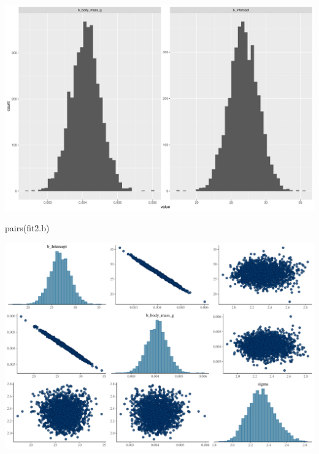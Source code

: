 \documentclass[
  letterpaper,
  DIV=11,
  numbers=noendperiod]{scrartcl}
\newenvironment{Shaded}{\begin{snugshade}}{\end{snugshade}}
\newcommand{\FunctionTok}[1]{\textcolor[rgb]{0.28,0.35,0.67}{#1}}
\newcommand{\NormalTok}[1]{\textcolor[rgb]{0.00,0.23,0.31}{#1}}
\begin{document}
\includegraphics{Bayes_Lab_1_files/figure-pdf/unnamed-chunk-59-1.pdf}

\begin{Shaded}
\begin{Highlighting}[]
\FunctionTok{pairs}\NormalTok{(fit2.b)}
\end{Highlighting}
\end{Shaded}

\includegraphics{Bayes_Lab_1_files/figure-pdf/unnamed-chunk-59-2.pdf}
\end{document}
